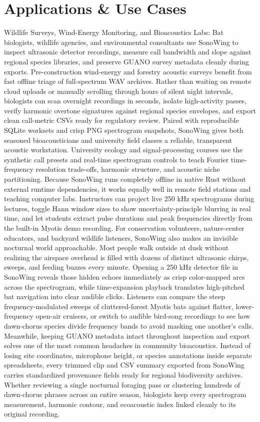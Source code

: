 \documentclass[10pt,letterpaper]{article}
\begin{document}
\section{Applications \& Use Cases}
Wildlife Surveys, Wind-Energy Monitoring, and Bioacoustics Labs: Bat biologists, wildlife agencies, and environmental consultants use SonoWing to inspect ultrasonic detector recordings, measure call bandwidth and slope against regional species libraries, and preserve GUANO survey metadata cleanly during exports. Pre-construction wind-energy and forestry acoustic surveys benefit from fast offline triage of full-spectrum WAV archives. Rather than waiting on remote cloud uploads or manually scrolling through hours of silent night intervals, biologists can scan overnight recordings in seconds, isolate high-activity passes, verify harmonic overtone signatures against regional species envelopes, and export clean call-metric CSVs ready for regulatory review. Paired with reproducible SQLite worksets and crisp PNG spectrogram snapshots, SonoWing gives both seasoned bioacousticians and university field classes a reliable, transparent acoustic workstation. University ecology and signal-processing courses use the synthetic call presets and real-time spectrogram controls to teach Fourier time-frequency resolution trade-offs, harmonic structure, and acoustic niche partitioning. Because SonoWing runs completely offline in native Rust without external runtime dependencies, it works equally well in remote field stations and teaching computer labs. Instructors can project live 250 kHz spectrograms during lectures, toggle Hann window sizes to show uncertainty-principle blurring in real time, and let students extract pulse durations and peak frequencies directly from the built-in Myotis demo recording. For conservation volunteers, nature-center educators, and backyard wildlife listeners, SonoWing also makes an invisible nocturnal world approachable. Most people walk outside at dusk without realizing the airspace overhead is filled with dozens of distinct ultrasonic chirps, sweeps, and feeding buzzes every minute. Opening a 250 kHz detector file in SonoWing reveals those hidden echoes immediately as crisp color-mapped arcs across the spectrogram, while time-expansion playback translates high-pitched bat navigation into clear audible clicks. Listeners can compare the steep frequency-modulated sweeps of cluttered-forest Myotis bats against flatter, lower-frequency open-air cruisers, or switch to audible bird-song recordings to see how dawn-chorus species divide frequency bands to avoid masking one another's calls. Meanwhile, keeping GUANO metadata intact throughout inspection and export solves one of the most common headaches in community bioacoustics. Instead of losing site coordinates, microphone height, or species annotations inside separate spreadsheets, every trimmed clip and CSV summary exported from SonoWing carries standardized provenance fields ready for regional biodiversity archives. Whether reviewing a single nocturnal foraging pass or clustering hundreds of dawn-chorus phrases across an entire season, biologists keep every spectrogram measurement, harmonic contour, and ecoacoustic index linked cleanly to its original recording.
\end{document}
